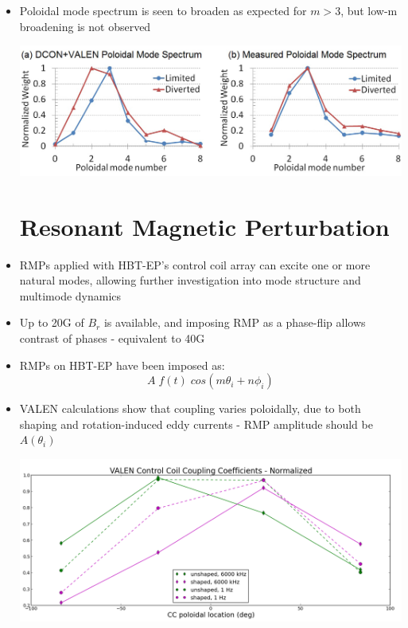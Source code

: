 \documentclass{article}
\begin{document}
\begin{multicols}{5}
\begin{itemize}
\item Poloidal mode spectrum is seen to broaden as expected for $ m>3$, but low-m broadening is not observed
\begin{center}
\includegraphics[width=1\columnwidth]{fig2_mode_spectrum_REV2.png}
\end{center}

\section{Resonant Magnetic Perturbation}
\item RMPs applied with HBT-EP's control coil array can excite one or more natural modes, allowing further investigation into mode structure and multimode dynamics\\
\item Up to 20G of $B_r$ is available, and imposing RMP as a phase-flip allows contrast of phases - equivalent to 40G\\
\item RMPs on HBT-EP have been imposed as:
\begin{equation}
A\;f(t)\;cos(m\theta_i+n\phi_i)
\end{equation}
\item VALEN calculations show that coupling varies poloidally, due to both shaping and rotation-induced eddy currents - RMP amplitude should be $A(\theta_i)$
\begin{center}
\includegraphics[width=1\columnwidth]{VALEN_CC_coupling}
\end{center}


\end{itemize}
\end{multicols}
\end{document}
